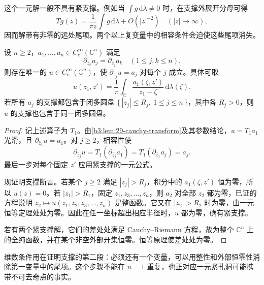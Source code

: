 这个一元解一般不具有紧支撑。例如当 \(\int g\,\mathrm{d}\lambda\ne0\) 时，在支撑外展开分母可得
\[
 Tg(z)=\frac1{\pi z}\int g\,\mathrm{d}\lambda+O(|z|^{-2})
 \quad(|z|\to\infty),
\]
因而解带有非零的远处尾项。两个以上复变量中的相容条件会迫使这些尾项消失。

\begin{proposition}[紧支撑相容方程组]\label{b3:prop:29-compact-support-dbar}
设 \(n\ge2\)，\(a_1,\ldots,a_n\in C_c^\infty(\mathbb C^n)\) 满足
\[
 \partial_{\bar z_k}a_j=\partial_{\bar z_j}a_k
 \quad(1\le j,k\le n).
\]
则存在唯一的 \(u\in C_c^\infty(\mathbb C^n)\)，使 \(\partial_{\bar z_j}u=a_j\) 对每个 \(j\) 成立。具体可取
\[
 u(z_1,z')=\frac1\pi\int_{\mathbb C}
 \frac{a_1(\zeta,z')}{z_1-\zeta}\,\mathrm{d}\lambda(\zeta).
\]
若所有 \(a_j\) 的支撑都包含于闭多圆盘 \(\{\,|z_j|\le R_j,\ 1\le j\le n\,\}\)，其中各 \(R_j>0\)，则 \(u\) 的支撑也包含于同一闭多圆盘。
\end{proposition}
\begin{proof}
记上述算子为 \(T_1\)。由\cref{b3:lem:29-cauchy-transform}及其参数结论，\(u=T_1a_1\) 光滑，且 \(\partial_{\bar z_1}u=a_1\)。对 \(j\ge2\)，相容性使
\[
 \partial_{\bar z_j}u
 =T_1(\partial_{\bar z_j}a_1)
 =T_1(\partial_{\bar z_1}a_j)=a_j.
\]
最后一步对每个固定 \(z'\) 应用紧支撑的一元公式。

现证明支撑断言。若某个 \(j\ge2\) 满足 \(|z_j|>R_j\)，积分中的 \(a_1(\zeta,z')\) 恒为零，所以 \(u(z)=0\)。若 \(|z_1|>R_1\)，固定 \(z_1,z_3,\ldots,z_n\)，则 \(a_2\) 对全部 \(z_2\) 都为零，已证的方程说明 \(z_2\mapsto u(z_1,z_2,z_3,\ldots,z_n)\) 是整函数。它又在 \(|z_2|>R_2\) 时为零，由一元恒等定理处处为零。因此在任一坐标超出相应半径时，\(u\) 都为零，确有紧支撑。

若有两个紧支撑解，它们的差处处满足 Cauchy--Riemann 方程，故为整个 \(\mathbb C^n\) 上的全纯函数，并在某个非空外部开集恒零。恒等原理使差处处为零。
\end{proof}

维数条件用在证明支撑的第二段：必须还有一个变量，可以用整性和外部恒零性消除第一变量中的尾项。这个步骤不能在 \(n=1\) 重复，也正对应一元紧孔洞可能携带不可去奇点的事实。


